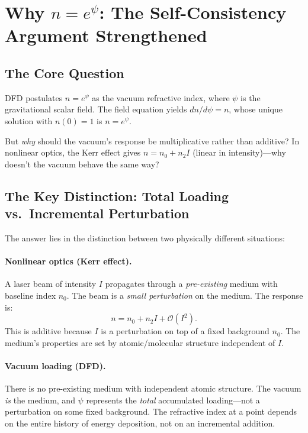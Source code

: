 \documentclass[11pt]{article}
\theoremstyle{plain}
\theoremstyle{definition}
\theoremstyle{remark}
\begin{document}
\section{Why $n = e^\psi$: The Self-Consistency Argument Strengthened}
\label{sec:exponential}

\subsection{The Core Question}

DFD postulates $n = e^\psi$ as the vacuum refractive index, where $\psi$
is the gravitational scalar field. The field equation yields
$dn/d\psi = n$, whose unique solution with $n(0) = 1$ is $n = e^\psi$.

But \emph{why} should the vacuum's response be multiplicative rather than
additive? In nonlinear optics, the Kerr effect gives
$n = n_0 + n_2 I$ (linear in intensity)---why doesn't the vacuum behave
the same way?

\subsection{The Key Distinction: Total Loading vs.\ Incremental Perturbation}

The answer lies in the distinction between two physically different situations:

\paragraph{Nonlinear optics (Kerr effect).}
A laser beam of intensity $I$ propagates through a \emph{pre-existing}
medium with baseline index $n_0$. The beam is a \emph{small perturbation}
on the medium. The response is:
\begin{equation}
n = n_0 + n_2 I + \mathcal{O}(I^2).
\end{equation}
This is additive because $I$ is a perturbation on top of a fixed background
$n_0$. The medium's properties are set by atomic/molecular structure
independent of $I$.

\paragraph{Vacuum loading (DFD).}
There is no pre-existing medium with independent atomic structure. The
vacuum \emph{is} the medium, and $\psi$ represents the \emph{total}
accumulated loading---not a perturbation on some fixed background. The
refractive index at a point depends on the entire history of energy
deposition, not on an incremental addition.
\end{document}
